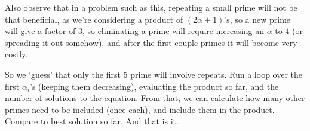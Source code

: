 Also observe that in a problem such as this, repeating a small prime will not be that beneficial, as we're considering a product of $(2\alpha+1)$'s, so a new prime will give a factor of 3, so eliminating a prime will require increasing an $\alpha$ to 4 (or spreading it out somehow), and after the first couple primes it will become very costly.

So we `guess' that only the first 5 prime will involve repeats.  Run a loop over the first $\alpha_i$'s (keeping them decreasing), evaluating the product so far, and the number of solutions to the equation.  From that, we can calculate how many other primes need to be included (once each), and include them in the product.  Compare to best solution so far.  And that is it.



